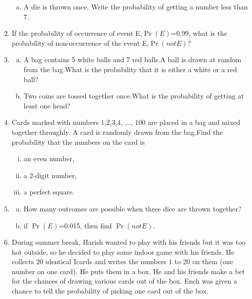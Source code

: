 \documentclass{article}
\providecommand{\pr}[1]{\ensuremath{\Pr\left(#1\right)}}
\begin{document}
\begin{enumerate}
\begin{enumerate}[(a)]
\item A die is thrown once. Write the probability of getting a number less than $7$.
\end{enumerate}
\item  If the probability of occurrence of event E,\pr{E}=0.99, what is the probability of non-occurrence of the event E,\pr {not E}?
\item \begin{enumerate}[(a)]
\item A bag contains 5 white balls and 7 red balls.A ball is drawn at random from the bag.What is the probability that it is either a white or a red ball?
\item Two coins are tossed together once.What is the probability of getting at least one head?
\end{enumerate}
\item Cards marked with numbers $1$,$2$,$3$,$4$, ..., $100$ are placed in a bag and mixed together throughly. A card is randomly drawn from the bag.Find the probability that the numbers on the card is
 \begin{enumerate}[(i)]
\item an even number,
\item a $2$-digit number,
\item a perfect square.
\end{enumerate}
\item \begin{enumerate}[(a)] 
\item How many outcomes are possible when three dice are thrown together?
\item if \pr{E}=0.015, then find \pr{not E}.
\end{enumerate}
\item  During summer break, Harish wanted to play with his friends but it was too hot outside, so he decided to play some indoor game with his friends. He collects $20$ identical Icards and writes the numbers $1$ to $20$ on them (one number on one card). He puts them in a box. He and his friends make a bet for the chances of drawing various cards out of the box. Ench was given a chance to tell the probability of picking one card out of the box.


\end{enumerate}
\end{document}
